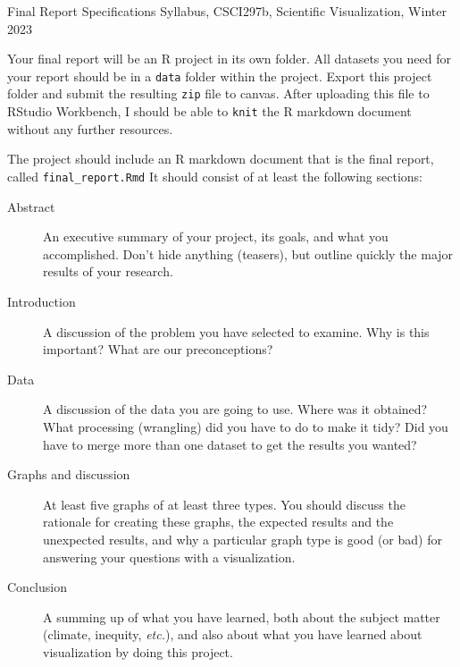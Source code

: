 \documentclass[12pt]{article}
\begin{document}
\sloppy

\begin{center}
{\Large Final Report Specifications}
{\large Syllabus, CSCI297b, Scientific Visualization, Winter 2023}
\end{center}

Your final report will be an R project in its own folder.  All datasets you need for your
report should be in a \verb|data| folder within the project.  Export this project folder
and submit the resulting \verb|zip| file to canvas.  After uploading this
file to RStudio Workbench, I should be able to \verb|knit| the R markdown
document without any further resources.

The project should include an R markdown document
that is the final report, called \verb|final_report.Rmd|  It should consist of at
least the following sections:
\begin{description}
\item[Abstract]  An executive summary of your project, its goals, 
and what you accomplished.  Don't hide anything (teasers), but
outline quickly the major results of your research.
\item[Introduction] A discussion of the problem you have selected
to examine.  Why is this important?  What are our preconceptions?
\item[Data] A discussion of the data you are going to use.  Where was it obtained?
What processing (wrangling) did you have to do to make it tidy?
Did you have to merge more than one dataset to get the results you wanted?
\item[Graphs and discussion] At least five graphs of at least three types.
You should discuss the rationale for creating these graphs, 
the expected results and the unexpected results,
and why a particular graph type is good (or bad) for 
answering your questions with a visualization.
\item[Conclusion] A summing up of what you have learned,
both about the subject matter (climate, inequity, {\em etc.}),
and also about what you have learned about visualization
by doing this project.
\end{description}
\end{document}
